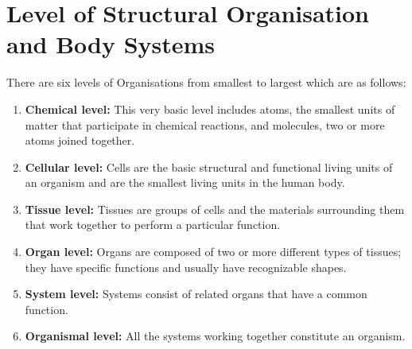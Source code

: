 \documentclass[12pt]{article}
\begin{document}
\section{Level of Structural Organisation and Body Systems}
There are six levels of Organisations from smallest to largest which are as follows:
\begin{enumerate}
    \item \textbf{Chemical level:} This very basic level includes atoms, the smallest units of matter that participate in chemical reactions, and
molecules, two or more atoms joined together.

    \item \textbf{Cellular level:} Cells are the basic structural and functional living units of an organism and are the smallest living units in the human body.

    \item \textbf{Tissue level:} Tissues are groups of cells and the materials surrounding them that work together to perform a particular function.
   
    \item \textbf{Organ level:} Organs are composed of two or more different types of tissues; they have specific functions and usually have recognizable shapes.
   
    \item \textbf{System level:} Systems consist of related organs that have a common function.

    \item \textbf{Organismal level:} All the systems working together constitute an organism.
\end{enumerate}
\end{document}
